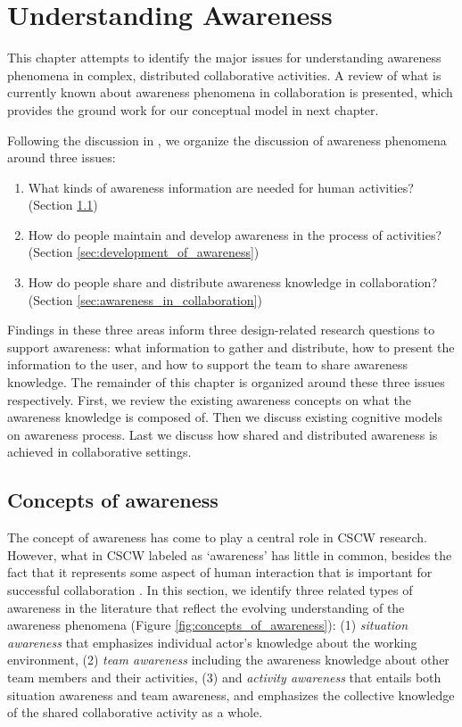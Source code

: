 \graphicspath{{Figures/}}
\chapter{Understanding Awareness} %
\label{cha:understanding_awareness}
This chapter attempts to identify the major issues for understanding awareness phenomena in complex, distributed collaborative activities. A review of what is currently known about awareness phenomena in collaboration is presented, which provides the ground work for our conceptual model in next chapter.

Following the discussion in \cite{Gutwin2002}, we organize the discussion of awareness phenomena around three issues:

\begin{enumerate}
   \item What kinds of awareness information are needed for human activities? (Section \ref{sec:concepts_of_awareness})
   \item How do people maintain and develop awareness in the process of activities? (Section \ref{sec:development_of_awareness})
   \item How do people share and distribute awareness knowledge in collaboration? (Section \ref{sec:awareness_in_collaboration})
\end{enumerate}

Findings in these three areas inform three design-related research questions to support awareness: what information to gather and distribute, how to present the information to the user, and how to support the team to share awareness knowledge. The remainder of this chapter is organized around these three issues respectively. First, we review the existing awareness concepts on what the awareness knowledge is composed of. Then we discuss existing cognitive models on awareness process. Last we discuss how shared and distributed awareness is achieved in collaborative settings.

\section{Concepts of awareness} %
\label{sec:concepts_of_awareness}
The concept of awareness has come to play a central role in CSCW research. However, what in CSCW labeled as `awareness' has little in common, besides the fact that it represents some aspect of human interaction that is important for successful collaboration \cite{schmidt2002a}. In this section, we identify three related types of awareness in the literature that reflect the evolving understanding of the awareness phenomena (Figure \ref{fig:concepts_of_awareness}): (1) \emph{situation awareness} that emphasizes individual actor's knowledge about the working environment, (2) \emph{team awareness} including the awareness knowledge about other team members and their activities, (3) and \emph{activity awareness} that entails both situation awareness and team awareness, and emphasizes the collective knowledge of the shared collaborative activity as a whole.

